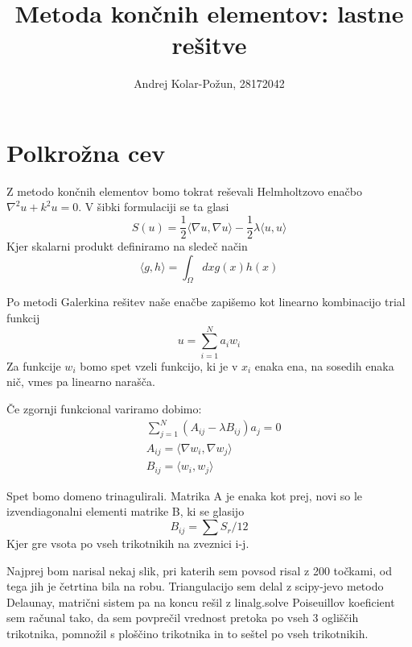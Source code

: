 \documentclass{article}
\title{Metoda končnih elementov: lastne rešitve}
\author{Andrej Kolar-Požun, 28172042}
\begin{document}
\maketitle
{}
\section{Polkrožna cev}

Z metodo končnih elementov bomo tokrat reševali Helmholtzovo enačbo $\nabla^2 u +k^2 u = 0$. V šibki formulaciji se ta glasi
\begin{equation*}
S(u) = \frac{1}{2} \langle \nabla u, \nabla u \rangle -  \frac{1}{2}\lambda\langle u,u \rangle
\end{equation*}
Kjer skalarni produkt definiramo na sledeč način
\begin{equation*}
\langle g,h \rangle = \int_\Omega dx g(x) h(x) 
\end{equation*}

Po metodi Galerkina rešitev naše enačbe zapišemo kot linearno kombinacijo trial funkcij
\begin{equation*}
u = \sum_{i=1}^N a_i w_i
\end{equation*}
Za funkcije $w_i$ bomo spet vzeli funkcijo, ki je v $x_i$ enaka ena, na sosedih enaka nič, vmes pa linearno narašča.

Če zgornji funkcional variramo dobimo:
\begin{align*}
&\sum_{j=1}^N \left(A_{ij} - \lambda B_{ij} \right) a_j = 0 \\
&A_{ij} = \langle \nabla w_i , \nabla w_j \rangle \\
&B_{ij} = \langle w_i , w_j \rangle
\end{align*}

Spet bomo domeno trinagulirali. Matrika A je enaka kot prej, novi so le izvendiagonalni elementi matrike B, ki se glasijo 
\begin{equation*}
B_{ij} = \sum S_r / 12
\end{equation*}
Kjer gre vsota po vseh trikotnikih na zveznici i-j.



Najprej bom narisal nekaj slik, pri katerih sem povsod risal z 200 točkami, od tega jih je četrtina bila na robu. Triangulacijo sem delal z scipy-jevo metodo Delaunay, matrični sistem pa na koncu rešil z linalg.solve
Poiseuillov koeficient sem računal tako, da sem povprečil vrednost pretoka po vseh 3 ogliščih trikotnika, pomnožil s ploščino trikotnika in to seštel po vseh trikotnikih.
\end{document}
